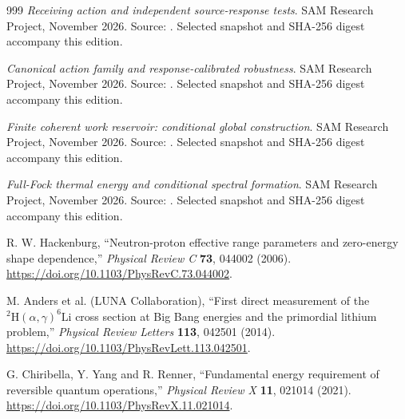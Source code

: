 \begin{thebibliography}{999}
\emph{Receiving action and independent source-response tests}. SAM Research Project, November 2026.
Source: . Selected snapshot and SHA-256 digest accompany this edition.

\emph{Canonical action family and response-calibrated robustness}. SAM Research Project, November 2026.
Source: . Selected snapshot and SHA-256 digest accompany this edition.

\emph{Finite coherent work reservoir: conditional global construction}. SAM Research Project, November 2026.
Source: . Selected snapshot and SHA-256 digest accompany this edition.

\emph{Full-Fock thermal energy and conditional spectral formation}. SAM Research Project, November 2026.
Source: . Selected snapshot and SHA-256 digest accompany this edition.

 R. W. Hackenburg, ``Neutron-proton effective range parameters and zero-energy shape dependence,'' \emph{Physical Review C} \textbf{73}, 044002 (2006). \url{https://doi.org/10.1103/PhysRevC.73.044002}.

 M. Anders et al. (LUNA Collaboration), ``First direct measurement of the $^2\mathrm H(\alpha,\gamma)^6\mathrm{Li}$ cross section at Big Bang energies and the primordial lithium problem,'' \emph{Physical Review Letters} \textbf{113}, 042501 (2014). \url{https://doi.org/10.1103/PhysRevLett.113.042501}.

 G. Chiribella, Y. Yang and R. Renner, ``Fundamental energy requirement of reversible quantum operations,'' \emph{Physical Review X} \textbf{11}, 021014 (2021). \url{https://doi.org/10.1103/PhysRevX.11.021014}.

\end{thebibliography}
